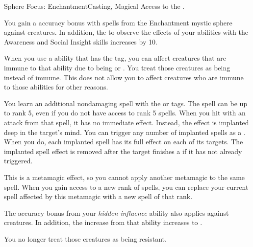   \begin{magicalfeat}{Sphere Focus: Enchantment}{Casting, Magical}
    \featpre Access to the  .

     You gain a  accuracy bonus with spells from the Enchantment mystic sphere against \unaware creatures.
    In addition, the  to observe the effects of your  abilities with the Awareness and Social Insight skills increases by 10.

     When you use a \magical ability that has the  tag, you can affect creatures that are immune to that ability due to being  or .
    You treat those creatures as being \resistant instead of immune.
    This does not allow you to affect creatures who are immune to those abilities for other reasons.

     You learn an additional nondamaging  spell with the \atCompulsion or \atEmotion tags.
    The spell can be up to rank 5, even if you do not have access to rank 5 spells.
    When you hit with an attack from that spell, it has no immediate effect.
    Instead, the effect is implanted deep in the target's mind.
    You can trigger any number of implanted spells as a .
    When you do, each implanted spell has its full effect on each of its targets.
    The implanted spell effect is removed after the target finishes a  if it has not already triggered.

    This is a metamagic effect, so you cannot apply another metamagic to the same spell.
    When you gain access to a new rank of spells, you can replace your current spell affected by this metamagic with a new spell of that rank.

     The accuracy bonus from your \textit{hidden influence} ability also applies against \partiallyunaware creatures.
    In addition, the  increase from that ability increases to .

     You no longer treat those creatures as being resistant.
  \end{magicalfeat}

